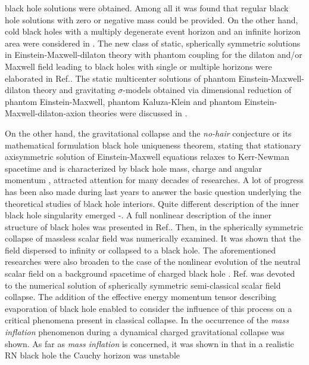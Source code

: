 \documentclass[aps,showpacs,nofootinbib,floatfix]{revtex4}
\begin{document}
black hole solutions were obtained. Among all it was found that regular black hole solutions with
zero or negative mass could be provided. On the other hand, 
cold black holes with a multiply degenerate 
event horizon and an infinite horizon area were considered in \cite{cle99}. 
The new class of static, spherically symmetric solutions in Einstein-Maxwell-dilaton theory with phantom
coupling for the dilaton and/or Maxwell field leading to black holes with single or multiple horizons were
elaborated in Ref.\cite{cle09}. The static multicenter solutions of 
phantom Einstein-Maxwell-dilaton theory and gravitating $\sigma$-models obtained via dimensional reduction
of phantom Einstein-Maxwell, phantom Kaluza-Klein and phantom Einstein-Maxwell-dilaton-axion theories were 
discussed in \cite{cle11}.
\par
On the other hand, the gravitational collapse 
and the {\it no-hair} conjecture or its mathematical formulation black hole uniqueness theorem,
stating that stationary axisymmetric solution of Einstein-Maxwell equations 
relaxes to Kerr-Newman spacetime and is characterized 
by black hole mass, charge and angular momentum \cite{uniq}, attracted attention for many decades of researches.
A lot of progress has been also made during last years to answer the basic question
underlying the theoretical studies of black hole interiors. 
Quite different description of the inner black hole singularity emerged \cite{his81}-\cite{is}.
A full nonlinear description of the inner structure
of black holes was presented in Ref.\cite{gne93}. Then, in \cite{ham96} the spherically symmetric 
collapse of massless scalar field was numerically examined. It was shown that the field
dispersed to infinity or collapsed to a black hole. The aforementioned researches were also broaden
to the case of the nonlinear evolution of the neutral scalar field on a background spacetime of charged black hole
\cite{bra95}. Ref.\cite{aya97} was devoted to the numerical solution of spherically symmetric
semi-classical scalar field collapse. The addition of the effective energy momentum tensor
describing evaporation of black hole enabled to consider the influence of this process on a critical
phenomena present in classical collapse.
In \cite{hod98} the occurrence of the {\it mass inflation}
phenomenon during a dynamical charged gravitational collapse was shown. As far as {\it mass inflation}
is concerned, it was shown in \cite{is} that in a realistic RN black hole the Cauchy horizon was unstable
\end{document}

